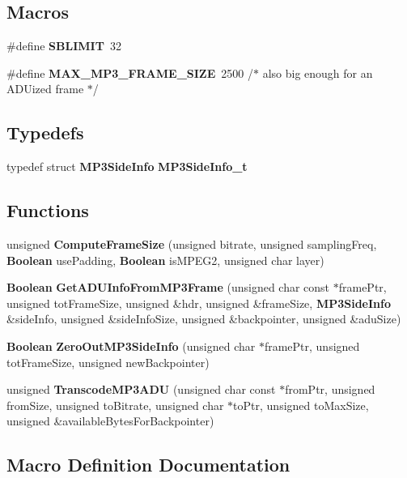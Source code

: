 \subsection*{Macros}
\begin{DoxyCompactItemize}
\item 
\#define {\bf S\+B\+L\+I\+M\+I\+T}~32
\item 
\#define {\bf M\+A\+X\+\_\+\+M\+P3\+\_\+\+F\+R\+A\+M\+E\+\_\+\+S\+I\+Z\+E}~2500 /$\ast$ also big enough for an \textquotesingle{}A\+D\+U\textquotesingle{}ized frame $\ast$/
\end{DoxyCompactItemize}
\subsection*{Typedefs}
\begin{DoxyCompactItemize}
\item 
typedef struct {\bf M\+P3\+Side\+Info} {\bf M\+P3\+Side\+Info\+\_\+t}
\end{DoxyCompactItemize}
\subsection*{Functions}
\begin{DoxyCompactItemize}
\item 
unsigned {\bf Compute\+Frame\+Size} (unsigned bitrate, unsigned sampling\+Freq, {\bf Boolean} use\+Padding, {\bf Boolean} is\+M\+P\+E\+G2, unsigned char layer)
\item 
{\bf Boolean} {\bf Get\+A\+D\+U\+Info\+From\+M\+P3\+Frame} (unsigned char const $\ast$frame\+Ptr, unsigned tot\+Frame\+Size, unsigned \&hdr, unsigned \&frame\+Size, {\bf M\+P3\+Side\+Info} \&side\+Info, unsigned \&side\+Info\+Size, unsigned \&backpointer, unsigned \&adu\+Size)
\item 
{\bf Boolean} {\bf Zero\+Out\+M\+P3\+Side\+Info} (unsigned char $\ast$frame\+Ptr, unsigned tot\+Frame\+Size, unsigned new\+Backpointer)
\item 
unsigned {\bf Transcode\+M\+P3\+A\+D\+U} (unsigned char const $\ast$from\+Ptr, unsigned from\+Size, unsigned to\+Bitrate, unsigned char $\ast$to\+Ptr, unsigned to\+Max\+Size, unsigned \&available\+Bytes\+For\+Backpointer)
\end{DoxyCompactItemize}


\subsection{Macro Definition Documentation}
